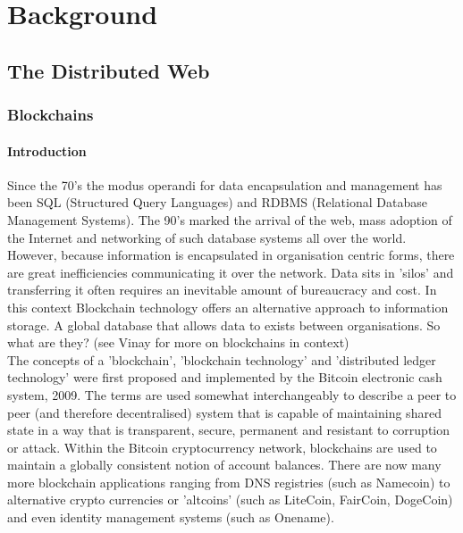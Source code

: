 
\chapter{Background} %

\label{Background} %

\section{The Distributed Web}

\subsection{Blockchains}

\subsubsection{Introduction}
Since the 70's the modus operandi for data encapsulation and management has been SQL (Structured Query Languages) and RDBMS (Relational Database Management Systems). The 90's marked the arrival of the web, mass adoption of the Internet and networking of such database systems all over the world. However, because information is encapsulated in organisation centric forms, there are great inefficiencies communicating it over the network. Data sits in 'silos' and transferring it often requires an inevitable amount of bureaucracy and cost. In this context Blockchain technology offers an alternative approach to information storage. A global database that allows data to exists between organisations. So what are they? (see Vinay \cite{VinayOnBlockchains} for more on blockchains in context) \\

The concepts of a 'blockchain',  'blockchain technology' and 'distributed ledger technology' were first proposed and implemented by the Bitcoin electronic cash system, 2009\cite{nakamoto2008bitcoin}. The terms are used somewhat interchangeably to describe a peer to peer (and therefore decentralised) system that is capable of maintaining shared state in a way that is transparent, secure, permanent and resistant to corruption or attack. Within the Bitcoin cryptocurrency network, blockchains are used to maintain a globally consistent notion of account balances. There are now many more blockchain applications ranging from DNS registries (such as Namecoin\cite{Namecoin}) to alternative crypto currencies or 'altcoins' (such as LiteCoin\cite{Litecoin}, FairCoin\cite{Faircoin}, DogeCoin\cite{Dogecoin}) and even identity management systems (such as Onename\cite{Onename}). \\

